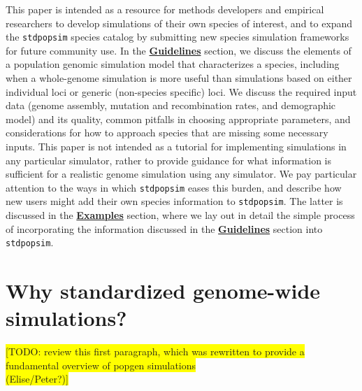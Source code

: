 \documentclass[hidelinks]{article}
\newcommand{\stdpopsim}{\texttt{stdpopsim}\xspace}
\begin{document}
This paper is intended as a resource for methods
developers and empirical researchers to develop simulations of their own
species of interest, and to expand the \stdpopsim species catalog
by submitting new species simulation frameworks for future community use.
In the \hyperref[sec:sim-guidelines]{\textbf{Guidelines}} section,
we discuss the elements of a
population genomic simulation model that characterizes a
species, including when a whole-genome simulation is more useful than
simulations based on either individual loci or generic (non-species specific) loci.
We discuss the required input data (genome assembly,
mutation and recombination rates, and demographic model) and
its quality, common pitfalls in choosing appropriate parameters, and
considerations for how to approach species that are missing some
necessary inputs. This paper is not intended as a tutorial for
implementing simulations in any particular simulator, rather to provide
guidance for what information is sufficient for a realistic genome simulation
using any simulator. We pay particular attention to the ways
in which \stdpopsim eases this burden, and describe how new users might
add their own species information to \stdpopsim.
The latter is discussed in the \hyperref[sec:examples]{\textbf{Examples}} section, where we lay out in
detail the simple process of incorporating the information discussed
in the \hyperref[sec:sim-guidelines]{\textbf{Guidelines}} section into \stdpopsim.




\hypertarget{sec2}{%
	\section*{Why standardized genome-wide simulations?}\label{sec:std-sim}}



%

\colorbox{yellow}{[TODO:  review this first paragraph, which was rewritten to
	provide a fundamental overview of popgen simulations}\\
\colorbox{yellow}{ (Elise/Peter?)]}
\end{document}
